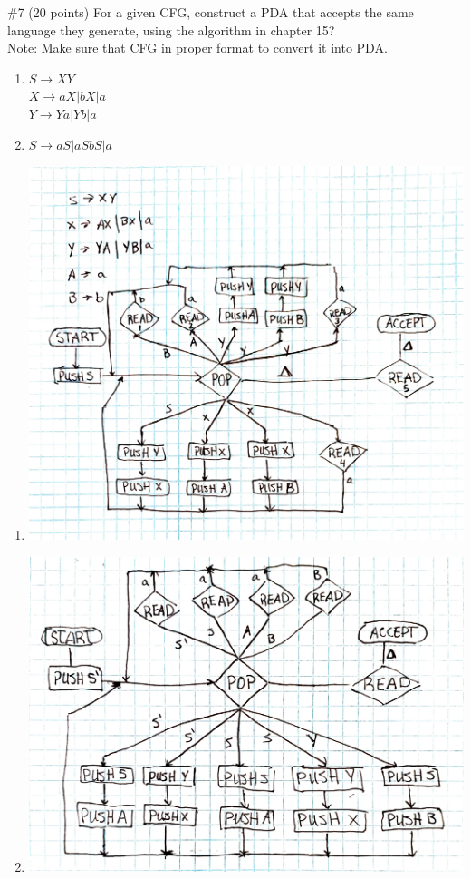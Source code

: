 \begin{problem}{\#7 (20 points)}
    For a given CFG, construct a PDA that accepts the same language they generate, using the algorithm in chapter 15?
    \\
    Note: Make sure that CFG in proper format to convert it into PDA.
    \begin{enumerate}[label=\alph*)]
        \item $S \to XY$\\
        $X \to aX | bX | a$\\
        $Y \to Ya | Yb | a$
        \item $S \to aS | aSbS | a$
    \end{enumerate}
\end{problem}
\begin{solution}
    \begin{enumerate}[label=\alph*)]
        \item \begin{center}
            \includegraphics[width=\linewidth]{figures/answer7a.pdf}
        \end{center}
        \item \begin{center}
            \includegraphics[width=\linewidth]{figures/answer7b.pdf}

\end{center}
\end{enumerate}
\end{solution}

